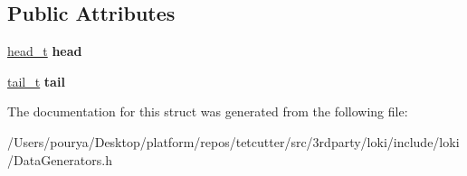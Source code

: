 \subsection*{Public Attributes}
\begin{DoxyCompactItemize}
\item 
\hypertarget{structLoki_1_1TL_1_1IterateTypes_3_01Typelist_3_01T1_00_01T2_01_4_00_01GenFunc_01_4_ad515e737724b740c257ffcf3136ef52c}{}\hyperlink{structLoki_1_1TL_1_1IterateTypes}{head\+\_\+t} {\bfseries head}\label{structLoki_1_1TL_1_1IterateTypes_3_01Typelist_3_01T1_00_01T2_01_4_00_01GenFunc_01_4_ad515e737724b740c257ffcf3136ef52c}

\item 
\hypertarget{structLoki_1_1TL_1_1IterateTypes_3_01Typelist_3_01T1_00_01T2_01_4_00_01GenFunc_01_4_a39de80a645087a6516288aedeff88aa7}{}\hyperlink{structLoki_1_1TL_1_1IterateTypes}{tail\+\_\+t} {\bfseries tail}\label{structLoki_1_1TL_1_1IterateTypes_3_01Typelist_3_01T1_00_01T2_01_4_00_01GenFunc_01_4_a39de80a645087a6516288aedeff88aa7}

\end{DoxyCompactItemize}


The documentation for this struct was generated from the following file\+:\begin{DoxyCompactItemize}
\item 
/\+Users/pourya/\+Desktop/platform/repos/tetcutter/src/3rdparty/loki/include/loki/Data\+Generators.\+h\end{DoxyCompactItemize}
